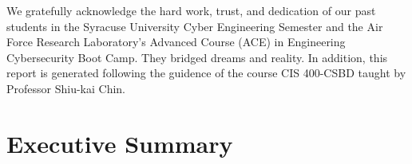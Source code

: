 \documentclass{report}
\begin{document}
\begin{acknowledgments}
  We gratefully acknowledge the hard work, trust, and dedication of
  our past students in the Syracuse University Cyber Engineering
  Semester and the Air Force Research Laboratory's Advanced Course
  (ACE) in Engineering Cybersecurity Boot Camp.  They bridged dreams
  and reality.  In addition, this report is generated following the
  guidence of the course CIS 400-CSBD taught by Professor Shiu-kai
  Chin.
\end{acknowledgments}

\tableofcontents{}

\chapter{Executive Summary}
\label{cha:executive-summary-1}
\end{document}
